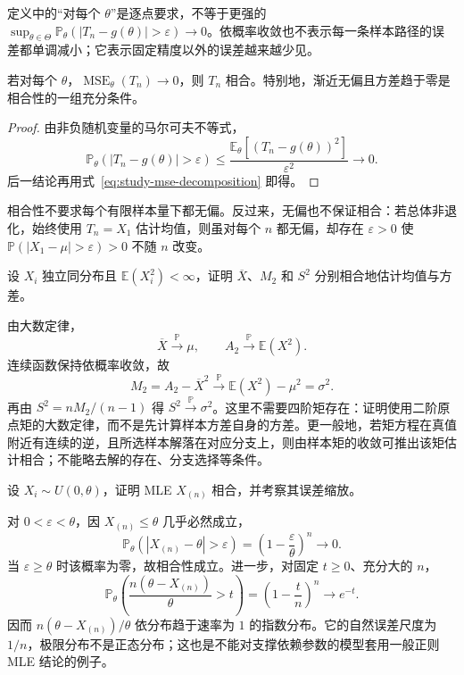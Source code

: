 定义中的“对每个 $\theta$”是逐点要求，不等于更强的 $\sup_{\theta\in\Theta}\mathbb P_\theta(|T_n-g(\theta)|>\varepsilon)\to0$。依概率收敛也不表示每一条样本路径的误差都单调减小；它表示固定精度以外的误差越来越少见。

\begin{proposition}[由均方误差趋于零判断相合性]
\label{prop:study-mse-consistency}
若对每个 $\theta$，$\operatorname{MSE}_\theta(T_n)\to0$，则 $T_n$ 相合。特别地，渐近无偏且方差趋于零是相合性的一组充分条件。
\end{proposition}

\begin{proof}
由非负随机变量的马尔可夫不等式，
\[
  \mathbb P_\theta(|T_n-g(\theta)|>\varepsilon)
    \le\frac{\mathbb E_\theta[(T_n-g(\theta))^2]}{\varepsilon^2}
    \longrightarrow0.
\]
后一结论再用式~\eqref{eq:study-mse-decomposition} 即得。
\end{proof}

相合性不要求每个有限样本量下都无偏。反过来，无偏也不保证相合：若总体非退化，始终使用 $T_n=X_1$ 估计均值，则虽对每个 $n$ 都无偏，却存在 $\varepsilon>0$ 使 $\mathbb P(|X_1-\mu|>\varepsilon)>0$ 不随 $n$ 改变。

\begin{example}
\label{ex:study-moment-consistency}
设 $X_i$ 独立同分布且 $\mathbb E(X_i^2)<\infty$，证明 $\overline X$、$M_2$ 和 $S^2$ 分别相合地估计均值与方差。
\end{example}

\begin{solve}
由大数定律，
\[
  \overline X\xrightarrow{\mathbb P}\mu,\qquad
  A_2\xrightarrow{\mathbb P}\mathbb E(X^2).
\]
连续函数保持依概率收敛，故
\[
  M_2=A_2-\overline X^2
      \xrightarrow{\mathbb P}\mathbb E(X^2)-\mu^2=\sigma^2.
\]
再由 $S^2=nM_2/(n-1)$ 得 $S^2\xrightarrow{\mathbb P}\sigma^2$。这里不需要四阶矩存在：证明使用二阶原点矩的大数定律，而不是先计算样本方差自身的方差。更一般地，若矩方程在真值附近有连续的逆，且所选样本解落在对应分支上，则由样本矩的收敛可推出该矩估计相合；不能略去解的存在、分支选择等条件。
\end{solve}

\begin{example}
\label{ex:study-uniform-maximum-consistency}
设 $X_i\sim U(0,\theta)$，证明 MLE $X_{(n)}$ 相合，并考察其误差缩放。
\end{example}

\begin{solve}
对 $0<\varepsilon<\theta$，因 $X_{(n)}\le\theta$ 几乎必然成立，
\begin{equation}
  \mathbb P_\theta(|X_{(n)}-\theta|>\varepsilon)
    =\left(1-\frac{\varepsilon}{\theta}\right)^n\longrightarrow0.
  \label{eq:study-uniform-maximum-consistency}
\end{equation}
当 $\varepsilon\ge\theta$ 时该概率为零，故相合性成立。进一步，对固定 $t\ge0$、充分大的 $n$，
\[
  \mathbb P_\theta\!\left(
      \frac{n(\theta-X_{(n)})}{\theta}>t
  \right)=\left(1-\frac tn\right)^n\longrightarrow e^{-t}.
\]
因而 $n(\theta-X_{(n)})/\theta$ 依分布趋于速率为 $1$ 的指数分布。它的自然误差尺度为 $1/n$，极限分布不是正态分布；这也是不能对支撑依赖参数的模型套用一般正则 MLE 结论的例子。
\end{solve}

